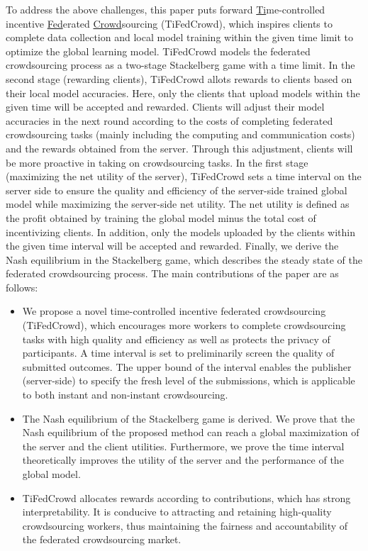 \documentclass[final,1p,times]{elsarticle}
\begin{document}
To address the above challenges, this paper puts forward \underline{Ti}me-controlled incentive \underline{Fed}erated \underline{Crowd}sourcing (TiFedCrowd), which inspires clients to complete data collection and local model training within the given time limit to optimize the global learning model. TiFedCrowd models the federated crowdsourcing process as a two-stage Stackelberg game \citep{li2017review} with a time limit. In the second stage (rewarding clients), TiFedCrowd allots rewards to clients based on their local model accuracies. Here, only the clients that upload models within the given time will be accepted and rewarded. Clients will adjust their model accuracies in the next round according to the costs of completing federated crowdsourcing tasks (mainly including the computing and communication costs) and the rewards obtained from the server. Through this adjustment, clients will be more proactive in taking on crowdsourcing tasks. In the first stage (maximizing the net utility of the server), TiFedCrowd sets a time interval on the server side to ensure the quality and efficiency of the server-side trained global model while maximizing the server-side net utility. The net utility is defined as the profit obtained by training the global model minus the total cost of incentivizing clients. In addition, only the models uploaded by the clients within the given time interval will be accepted and rewarded. Finally, we derive the Nash equilibrium in the Stackelberg game, which describes the steady state of the federated crowdsourcing process. The main contributions of the paper are as follows: 

\begin{itemize}
	\item We propose a novel time-controlled incentive federated crowdsourcing (TiFedCrowd), which encourages more workers to complete crowdsourcing tasks with high quality and efficiency as well as protects the privacy of participants. A time interval is set to preliminarily screen the quality of submitted outcomes. The upper bound of the interval enables the publisher (server-side) to specify the fresh level of the submissions, which is applicable to both instant and non-instant crowdsourcing.
	\item The Nash equilibrium of the Stackelberg game is derived. We prove that the Nash equilibrium of the proposed method can reach a  global maximization of the server and the client utilities. Furthermore, we prove the time interval theoretically improves the utility of the server and the performance of the global model.
	\item TiFedCrowd allocates rewards according to contributions, which has strong interpretability. It is conducive to attracting and retaining high-quality crowdsourcing workers, thus maintaining the fairness and accountability of the federated crowdsourcing market.
\end{itemize}
\end{document}
